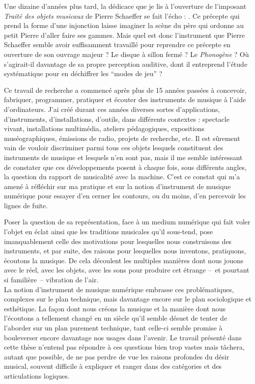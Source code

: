 \indent Une dizaine d'années plus tard, la dédicace que je lis à l'ouverture de l'imposant \textit{Traité des objets musicaux} de Pierre Schaeffer se fait l'écho : . 
Ce précepte qui prend la forme d'une injonction laisse imaginer la scène du père qui ordonne au petit Pierre d'aller faire ses gammes. Mais quel est donc l'instrument que Pierre Schaeffer semble avoir suffisamment travaillé pour reprendre ce précepte en ouverture de son ouvrage majeur ? Le disque à sillon fermé ? Le \textit{Phonogène} ? Où s'agirait-il davantage de sa propre perception auditive, dont il entreprend l'étude systématique pour en déchiffrer les ``modes de jeu'' ?

\indent Ce travail de recherche a commencé après plus de 15 années passées à concevoir, fabriquer, programmer, pratiquer et écouter des instruments de musique à l'aide d'ordinateurs. J'ai créé durant ces années diverses sortes d'applications, d'instruments, d'installations, d'outils, dans différents contextes : spectacle vivant, installations multimédia, ateliers pédagogiques, expositions muséographiques, émissions de radio, projets de recherche, etc. Il est sûrement vain de vouloir discriminer parmi tous ces objets lesquels constituent des instruments de musique et lesquels n'en sont pas, mais il me semble intéressant de constater que ces développements posent à chaque fois, sous différents angles, la question du rapport de musicalité avec la machine. C'est ce constat qui m'a amené à réfléchir sur ma pratique et sur la notion d'instrument de musique numérique pour essayer d'en cerner les contours, ou du moins, d'en percevoir les lignes de fuite.

\indent Poser la question de sa représentation, face à un medium numérique qui fait voler l’objet en éclat ainsi que les traditions musicales qu’il sous-tend, pose imanquablement celle des motivations pour lesquelles nous construisons des instruments, et par suite, des raisons pour lesquelles nous inventons, pratiquons, écoutons la musique. De cela découlent les multiples manières dont nous jouons avec le réel, avec les objets, avec les sons pour produire cet étrange --~et pourtant si familière~-- vibration de l'air.\\
\indent La notion d’instrument de musique numérique embrasse ces problématiques, complexes sur le plan technique, mais davantage encore sur le plan sociologique et esthétique. La façon dont nous créons la musique et la manière dont nous l’écoutons a tellement changé en un siècle qu’il semble désuet de tenter de l’aborder sur un plan purement technique, tant celle-ci semble promise à bouleverser encore davantage nos usages dans l’avenir. Le travail présenté dans cette thèse n'entend pas répondre à ces questions bien trop vastes mais tâchera, autant que possible, de ne pas perdre de vue les raisons profondes du désir musical, souvent difficile à expliquer et ranger dans des catégories et des articulations logiques.



